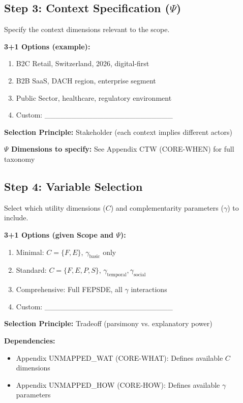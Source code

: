 \subsection{Step 3: Context Specification ($\Psi$)}

Specify the context dimensions relevant to the scope.

\begin{tcolorbox}[colback=white, colframe=black,
    title=Step 3: Context Specification]
\textbf{3+1 Options (example):}
\begin{enumerate}
\item[$\square$] B2C Retail, Switzerland, 2026, digital-first
\item[$\square$] B2B SaaS, DACH region, enterprise segment
\item[$\square$] Public Sector, healthcare, regulatory environment
\item[$\square$] Custom: \_\_\_\_\_\_\_\_\_\_\_\_\_\_\_\_\_\_\_\_\_\_\_\_
\end{enumerate}

\textbf{Selection Principle:} Stakeholder (each context implies different actors)

\textbf{$\Psi$ Dimensions to specify:} See Appendix CTW (CORE-WHEN) for full taxonomy
\end{tcolorbox}

\subsection{Step 4: Variable Selection}

Select which utility dimensions ($C$) and complementarity parameters ($\gamma$) to include.

\begin{tcolorbox}[colback=white, colframe=black,
    title=Step 4: Variable Selection]
\textbf{3+1 Options (given Scope and $\Psi$):}
\begin{enumerate}
\item[$\square$] Minimal: $C = \{F, E\}$, $\gamma_{\text{basic}}$ only
\item[$\square$] Standard: $C = \{F, E, P, S\}$, $\gamma_{\text{temporal}}, \gamma_{\text{social}}$
\item[$\square$] Comprehensive: Full FEPSDE, all $\gamma$ interactions
\item[$\square$] Custom: \_\_\_\_\_\_\_\_\_\_\_\_\_\_\_\_\_\_\_\_\_\_\_\_
\end{enumerate}

\textbf{Selection Principle:} Tradeoff (parsimony vs. explanatory power)

\textbf{Dependencies:}
\begin{itemize}[nosep]
\item Appendix UNMAPPED_WAT (CORE-WHAT): Defines available $C$ dimensions
\item Appendix UNMAPPED_HOW (CORE-HOW): Defines available $\gamma$ parameters
\end{itemize}
\end{tcolorbox}

